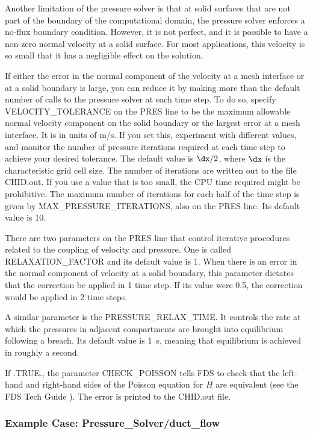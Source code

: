 \documentclass[11pt]{book}
\begin{document}
Another limitation of the pressure solver is that at solid surfaces that are not part of the boundary of the computational domain,
the pressure solver enforces a no-flux boundary condition. However, it is not perfect, and
it is possible to have a non-zero normal velocity at a solid surface. For most applications, this velocity is so small that it has a negligible effect on the solution.

If either the error in the normal component of the velocity at a mesh interface or at a solid boundary is large, you
can reduce it by making more than the default number of calls to the pressure solver at each time step.
To do so, specify {\ct VELOCITY\_TOLERANCE} on the {\ct PRES} line to be the maximum allowable normal velocity component on the solid
boundary or the largest error at a mesh interface. It is in units of m/s.
If you set this, experiment with different values, and monitor the number of pressure iterations required at each time step to achieve your
desired tolerance. The default value is $\dx/2$, where $\dx$ is the characteristic grid cell size.
The number of iterations are written out to the file {\ct CHID.out}. If you use a value that is too small, the CPU time required might be prohibitive.
The maximum number of iterations for each half of the time step is given by {\ct MAX\_PRESSURE\_ITERATIONS}, also on the {\ct PRES} line. Its default value is 10.

There are two parameters on the {\ct PRES} line that control iterative procedures related to the coupling of velocity and pressure. One is
called {\ct RELAXATION\_FACTOR} and its default value is 1. When there is an error in the normal component of velocity at a solid boundary, this
parameter dictates that the correction be applied in 1 time step. If its value were 0.5, the correction would be applied in 2 time steps.

A similar parameter is the {\ct PRESSURE\_RELAX\_TIME}. It controls the rate at which the pressures in adjacent compartments are brought into equilibrium following a
breach. Its default value is 1~s, meaning that equilibrium is achieved in roughly a second.

If {\ct .TRUE.}, the parameter {\ct CHECK\_POISSON} tells FDS to check that the left-hand and right-hand sides of the Poisson equation for $H$ are equivalent (see the FDS Tech Guide \cite{FDS_Math_Guide}).  The error is printed to the {\ct CHID.out} file.


\subsubsection{Example Case: Pressure\_Solver/duct\_flow}
\end{document}
